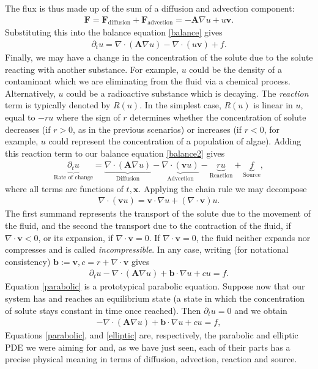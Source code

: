 \documentclass[
	a4paper,
	DIV=14,
	abstract=true,
	numbers=noenddot
]
{scrartcl}
\theoremstyle{definition}
\begin{document}
The flux is thus made up of the sum of a diffusion and advection component:
\begin{align*}
	\bm{F}=\bm{F}_{\text{diffusion} }+ \bm{F}_{\text{advection} } =- \bm{A}\nabla u+ u \bm{v}   .
\end{align*}
Substituting  this into the balance equation \eqref{balance} gives
\begin{align}\label{balance2}
	\partial_t u=\nabla \cdot (\bm{A}\nabla u) -\nabla \cdot  (u \bm{v})+ f.
\end{align}
Finally, we may have a change in the concentration of the solute due to the solute reacting with another substance. For example, $u$ could be the density of a contaminant which we are eliminating from the fluid via a chemical process. Alternatively, $u$ could be a radioactive substance which is decaying. The \emph{reaction} term is typically denoted by  $R(u)$. In the simplest case, $R(u)$ is linear in  $u$, equal to  $-ru$ where the sign of $r$ determines whether the concentration of solute decreases (if $r>0$, as in the previous scenarios) or increases (if $r<0$, for example, $u$ could represent the concentration of a population of algae). Adding this reaction term to our balance equation \eqref{balance2} gives
\begin{align*}
	\underbrace{\partial_t u}_{\text{Rate of change} }= \underbrace{\nabla \cdot (\bm{A}\nabla u)}_{\text{Diffusion}} - \underbrace{\nabla \cdot ( \bm{v}u)}_{\text{Advection}} -\underbrace{ru}_{\text{Reaction}}  +\underbrace{f}_{\text{Source}},
\end{align*}
where all terms are functions of $t,\bm{x}$. Applying the chain rule we may decompose
\begin{align*}
	\nabla \cdot ( \bm{v}u)= \bm{v}\cdot \nabla u+ (\nabla \cdot \bm{v})u .
\end{align*}
The first summand represents the transport of the solute due to the movement of the fluid, and the second the transport due to the contraction of the fluid, if $\nabla \cdot \bm{v}<0$, or its expansion, if $\nabla \cdot \bm{v}=0$. If $\nabla \cdot \bm{v} =0$, the fluid neither expands nor compresses and is called \emph{incompressible}. In any case, writing (for notational consistency) $\bm{b} :=\bm{v}, c=r+\nabla \cdot \bm{v} $ gives
\begin{align}\label{parabolic}
	\partial_t u-\nabla \cdot (\bm{A}\nabla u) +\bm{b} \cdot \nabla u + c u= f  .
\end{align}
Equation \eqref{parabolic} is a prototypical parabolic equation. Suppose now that our system has and reaches an equilibrium state (a state in which the concentration of solute stays constant in time once reached). Then $\partial _t u=0$ and we obtain
\begin{align}\label{elliptic}
	-\nabla \cdot (\bm{A}\nabla u) + \bm{b} \cdot \nabla u+cu = f,
\end{align}
Equations \eqref{parabolic}, and \eqref{elliptic} are, respectively, the parabolic and elliptic PDE we were aiming for and, as we have just seen, each of their parts has a precise physical meaning in terms of diffusion, advection, reaction and source.
\end{document}
